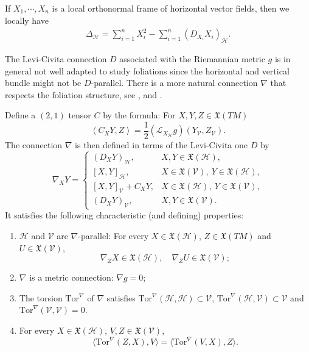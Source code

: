\documentclass[11pt]{article}
\numberwithin{equation}{section}
\newcommand{\Ho}{\mathcal H}
\newcommand{\V}{\mathcal V}
\newcommand{\hor}{\mathcal H}
\newcommand{\ver}{\mathcal V}
\newcommand{\Tor}{\mathrm{Tor}}
\begin{document}
If $X_1,\cdots,X_n$ is a local orthonormal frame of horizontal vector fields, then we locally have
\begin{align}\label{def: horizontal laplace}
\Delta_{\mathcal{H}}=\sum_{i=1}^n X_i^2 -\sum_{i=1}^n (D_{X_i}X_i)_{\mathcal{H}}.
\end{align}

The Levi-Civita connection $D$ associated with the Riemannian metric $g$ is in general not well adapted to study foliations since the horizontal and vertical bundle might not be $D$-parallel.  There is a more natural connection $\nabla$   that respects the foliation structure, see    \cite{Hladky}, \cite{baudoin2019comparison} and \cite{AGAG}.  

Define a $(2,1)$ tensor $ C$ by the formula: For $X,Y,Z \in \mathfrak{X}(TM)$
\begin{equation}
\left\langle C_X Y, Z\right\rangle = \frac{1}{2}(\mathcal{L}_{X_\hor}g)(Y_\ver,Z_\ver).
\end{equation}
The connection $\nabla$ is then defined in terms of the Levi-Civita one $D$ by
\[
\nabla_X Y =
\begin{cases}
 ( D_X Y)_{\mathcal{H}} , &X,Y \in \mathfrak{X}(\mathcal{H}), \\
  [X,Y]_{\mathcal{H}},  &X \in \mathfrak{X}(\mathcal{V}),\ Y \in \mathfrak{X}(\mathcal{H}), \\
  [X,Y]_{\mathcal{V}}+C_X Y,  &X \in \mathfrak{X}(\mathcal{H}),\ Y \in \mathfrak{X}(\mathcal{V}), \\
 (D_X Y)_{\mathcal{V}} , &X,Y \in \mathfrak{X}(\mathcal{V}).
\end{cases}
\]
It satisfies the following characteristic (and defining) properties:
\begin{enumerate}
\item $\Ho$ and $\V$ are $\nabla$-parallel: For every $X \in \mathfrak{X}(\mathcal{H})$, $Z \in \mathfrak{X}(TM)$ and $U \in \mathfrak{X}(\mathcal{V})$,
\[
\nabla_Z X \in \mathfrak{X}(\mathcal{H}), \quad \nabla_Z U \in \mathfrak{X}(\mathcal{V});
\]
\item $\nabla$ is a metric connection: $\nabla g=0$;
\item The torsion $\Tor^\nabla$ of $\nabla$ satisfies $\Tor^\nabla(\mathcal{H},\mathcal{H}) \subset \mathcal{V}$, $\Tor^\nabla(\mathcal{H},\mathcal{V}) \subset \mathcal{V}$ and $\Tor^\nabla(\mathcal{V},\mathcal{V}) =0$.
\item For every $X \in \mathfrak{X}(\mathcal{H})$, $V,Z \in \mathfrak{X}(\mathcal{V})$, 
\begin{equation}\label{symmetry torsion}
 \langle \Tor^\nabla(Z,X), V \rangle =\langle \Tor^\nabla(V,X), Z \rangle.
\end{equation}

\end{enumerate}
\end{document}
